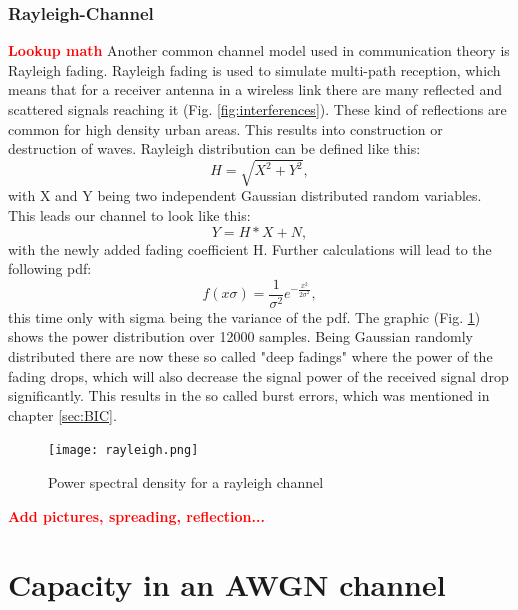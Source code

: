 \documentclass[12pt,oneside, draft]{report}
\newcommand\boldred[1]{\textcolor{red}{\textbf{#1}}}
\begin{document}
\newpage
\subsection{Rayleigh-Channel}
\boldred{Lookup math}
\newline
Another common channel model used in communication theory is Rayleigh fading. Rayleigh fading is used to simulate multi-path reception, which means that for a receiver antenna in a wireless link there are many reflected and scattered signals reaching it (Fig. \ref{fig:interferences}). These kind of reflections are common for high density urban areas. This results into construction or destruction of waves. Rayleigh distribution can be defined like this: 
\newline
\begin{equation}
\label{eq:rayleigh}
 H = \sqrt{X^2 + Y^2},
\end{equation}
with X and Y being two independent Gaussian distributed random variables. This leads our channel to look like this:
\newline
\begin{equation}
\label{eq:rayleighchan}
Y = H * X + N,
\end{equation}
with the newly added fading coefficient H.
\newline
Further calculations will lead to the following pdf:
\begin{equation}
\label{eq:raypdf}
f(x\sigma) = \frac{1}{\sigma^2}e^{-\frac{x^2}{2\sigma^2}},
\end{equation}
this time only with sigma being the variance of the pdf. The graphic (Fig. \ref{fig:rayleigh}) shows the power distribution over 12000 samples. Being Gaussian randomly distributed there are now these so called "deep fadings" where the power of the fading drops, which will also decrease the signal power of the received signal drop significantly. This results in the so called burst errors, which was mentioned in chapter \ref{sec:BIC}.
\begin{figure}[H]
	\centering
	\texttt{[image: rayleigh.png]}
	\caption{Power spectral density for a rayleigh channel}
	\label{fig:rayleigh}
\end{figure}

\boldred{Add pictures, spreading, reflection...}
	
\newpage
\chapter{Capacity in an AWGN channel}
\end{document}
